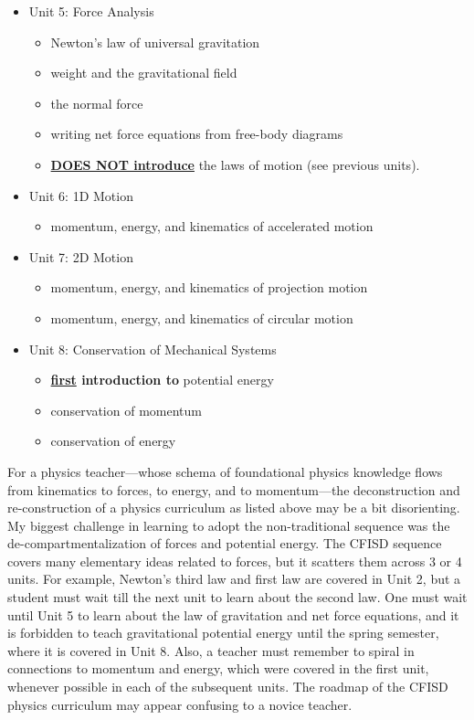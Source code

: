 \documentclass[12pt]{article}
\begin{document}
\begin{itemize}[itemsep=-2pt,topsep=-2pt]
\begin{itemize}[itemsep=-2pt,topsep=-2pt]
    \end{itemize}
    \item Unit 5: Force Analysis
    \begin{itemize}[itemsep=-2pt,topsep=-2pt]
        \item Newton's law of universal gravitation
        \item weight and the gravitational field
        \item the normal force
        \item writing net force equations from free-body diagrams
        \item \textbf{\underline{DOES NOT introduce}} the laws of motion (see previous units).
    \end{itemize}
    \item Unit 6: 1D Motion
    \begin{itemize}[itemsep=-2pt,topsep=-2pt]
        \item momentum, energy, and kinematics of accelerated motion
    \end{itemize}
    \item Unit 7: 2D Motion
    \begin{itemize}[itemsep=-2pt,topsep=-2pt]
        \item momentum, energy, and kinematics of projection motion 
        \item momentum, energy, and kinematics of circular motion
    \end{itemize}
    \item Unit 8: Conservation of Mechanical Systems
    \begin{itemize}[itemsep=-2pt,topsep=-2pt]
        \item \textbf{\underline{first} introduction to} potential energy
        \item conservation of momentum
        \item conservation of energy
    \end{itemize}
\end{itemize}
\egroup

For a physics teacher---whose schema of foundational physics knowledge flows from kinematics to forces, to energy, and to momentum---the deconstruction and re-construction of a physics curriculum as listed above may be a bit disorienting. My biggest challenge in learning to adopt the non-traditional sequence was the de-compartmentalization of forces and potential energy. The CFISD sequence covers many elementary ideas related to forces, but it scatters them across 3 or 4 units. For example, Newton's third law and first law are covered in Unit 2, but a student must wait till the next unit to learn about the second law. One must wait until Unit 5 to learn about the law of gravitation and net force equations, and it is forbidden to teach gravitational potential energy until the spring semester, where it is covered in Unit 8. Also, a teacher must remember to spiral in connections to momentum and energy, which were covered in the first unit, whenever possible in each of the subsequent units. The roadmap of the CFISD physics curriculum may appear confusing to a novice teacher.
\end{document}
